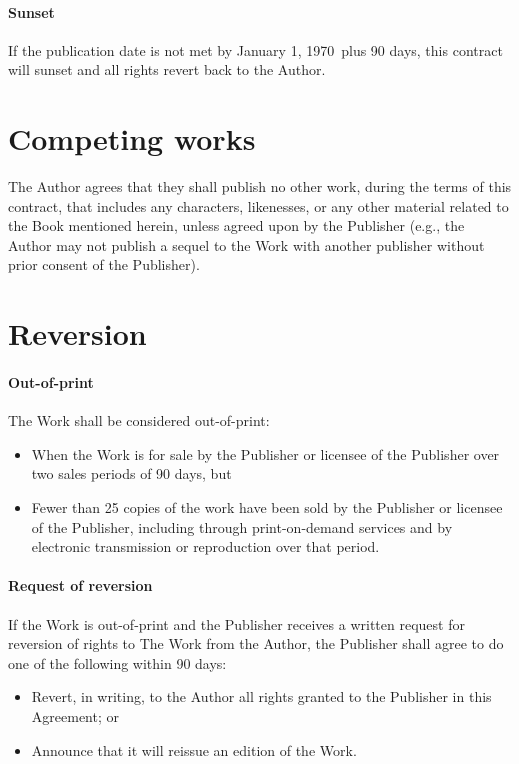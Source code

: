 \documentclass[12pt,letterpaper]{article}
\def\PublicationDate{January 1, 1970}
\begin{document}
\paragraph{Sunset}

If the publication date is not met by \PublicationDate\ plus 90 days, this contract will sunset and all rights revert back to the Author.

\section{Competing works}

The Author agrees that they shall publish no other work, during the terms of this contract, that includes any characters, likenesses, or any other material related to the Book mentioned herein, unless agreed upon by the Publisher (e.g., the Author may not publish a sequel to the Work with another publisher without prior consent of the Publisher).

\section{Reversion}

\paragraph{Out-of-print}

The Work shall be considered out-of-print:

\begin{itemize}
    \item When the Work is for sale by the Publisher or licensee of the Publisher over two sales periods of 90 days, but
    \item Fewer than 25 copies of the work have been sold by the Publisher or licensee of the Publisher, including through print-on-demand services and by electronic transmission or reproduction over that period.
\end{itemize}

\paragraph{Request of reversion}

If the Work is out-of-print and the Publisher receives a written request for reversion of rights to The Work from the Author, the Publisher shall agree to do one of the following within 90 days:

\begin{itemize}
    \item Revert, in writing, to the Author all rights granted to the Publisher in this Agreement; or
    \item Announce that it will reissue an edition of the Work.
\end{itemize}
\end{document}
